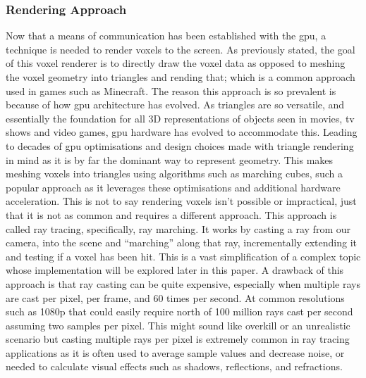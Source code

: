\documentclass[titlepage]{article}
\begin{document}
\subsubsection{Rendering Approach}
Now that a means of communication has been established with the \gls{gpu}, a technique is needed to render voxels to the screen. As previously stated, the goal of this voxel renderer is to directly draw the voxel data as opposed to meshing the voxel geometry into triangles and rending that; which is a common approach used in games such as Minecraft. The reason this approach is so prevalent is because of how \gls{gpu} architecture has evolved. As triangles are so versatile, and essentially the foundation for all 3D representations of objects seen in movies, tv shows and video games, \gls{gpu} hardware has evolved to accommodate this. Leading to decades of \gls{gpu} optimisations and design choices made with triangle rendering in mind as it is by far the dominant way to represent geometry. This makes meshing voxels into triangles using algorithms such as marching cubes, such a popular approach as it leverages these optimisations and additional hardware acceleration. This is not to say rendering voxels isn't possible or impractical, just that it is not as common and requires a different approach. This approach is called ray tracing, specifically, ray marching. It works by casting a ray from our camera, into the scene and ``marching'' along that ray, incrementally extending it and testing if a voxel has been hit. This is a vast simplification of a complex topic whose implementation will be explored later in this paper. A drawback of this approach is that ray casting can be quite expensive, especially when multiple rays are cast per pixel, per frame, and 60 times per second. At common resolutions such as 1080p that could easily require north of 100 million rays cast per second assuming two samples per pixel. This might sound like overkill or an unrealistic scenario but casting multiple rays per pixel is extremely common in ray tracing applications as it is often used to average sample values and decrease noise, or needed to calculate visual effects such as shadows, reflections, and refractions.
\end{document}
